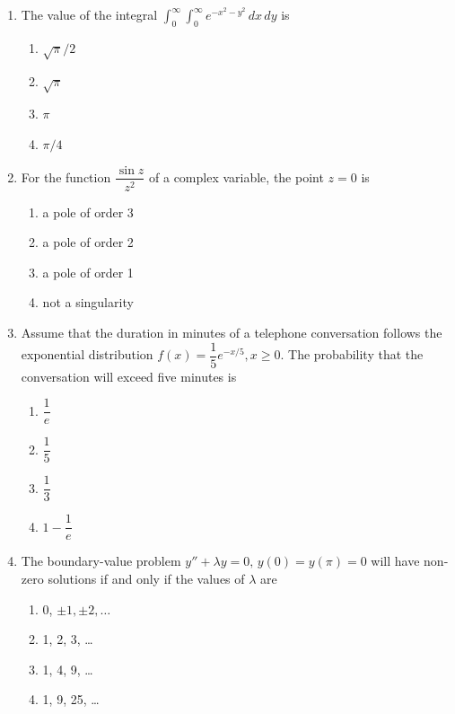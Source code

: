 \documentclass[journal]{IEEEtran}
\begin{document}
\begin{enumerate}
\item The value of the integral $\int_{0}^{\infty} \int_{0}^{\infty} e^{-x^2-y^2} \, dx\, dy$ is  
\begin{multicols}{4}
\begin{enumerate}
\item $\sqrt{\pi}/2$  
\item $\sqrt{\pi}$  
\item $\pi$  
\item $\pi/4$  
\end{enumerate}
\end{multicols}


\item For the function $\dfrac{\sin z}{z^2}$ of a complex variable, the point $z=0$ is  
\begin{multicols}{2}
\begin{enumerate}
\item a pole of order 3  
\item a pole of order 2  
\item a pole of order 1  
\item not a singularity  
\end{enumerate}
\end{multicols}


\item Assume that the duration in minutes of a telephone conversation follows the exponential distribution $f(x) = \dfrac{1}{5} e^{-x/5}, x \geq 0$. The probability that the conversation will exceed five minutes is  
\begin{multicols}{4}
\begin{enumerate}
\item $\dfrac{1}{e}$  
\item $\dfrac{1}{5}$  
\item $\dfrac{1}{3}$  
\item $1 - \dfrac{1}{e}$  
\end{enumerate}
\end{multicols}


\item The boundary-value problem $y'' + \lambda y = 0, \, y(0)=y(\pi)=0$ will have non-zero solutions if and only if the values of $\lambda$ are  
\begin{multicols}{2}
\begin{enumerate}
\item 0, $\pm 1, \pm 2, \dots$  
\item 1, 2, 3, \dots  
\item 1, 4, 9, \dots  
\item 1, 9, 25, \dots  
\end{enumerate}
\end{multicols}



\end{enumerate}
\end{document}
